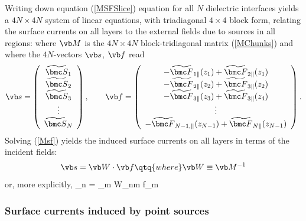 \documentclass[letterpaper]{article}
\renewcommand{\wt}{\widetilde}
\begin{document}
Writing down equation (\ref{MSFSlice}) equation for all $N$ dielectric
interfaces yields a $4N\times 4N$ 
system of linear equations, with triadiagonal $4\times 4$ block form,
relating the surface currents on all layers
to the external fields due to sources in all regions:
where $\vb M$ is the $4N\times 4N$ block-tridiagonal matrix
(\ref{MChunks}) and where the $4N$-vectors $\vb s$, $\vb f$ read
$$ 
   \vb s=\left(\begin{array}{c}
   \wt{\bmc S}_1 \\ \wt{\bmc S}_2 \\ \wt{\bmc S}_3 \\ \vdots \\
   \wt{\bmc S}_N
   \end{array}\right),
\qquad 
   \vb f=\left(\begin{array}{c}
  -\wt{\bmc F}_{1\parallel}(z_1)
  +\wt{\bmc F}_{2\parallel}(z_1)
\\
  -\wt{\bmc F}_{2\parallel}(z_2)
  +\wt{\bmc F}_{3\parallel}(z_2)
\\
  -\wt{\bmc F}_{3\parallel}(z_3)
  +\wt{\bmc F}_{3\parallel}(z_4)
\\
  \vdots
\\
  -\wt{\bmc F}_{N-1,\parallel}(z_{N-1})
  +\wt{\bmc F}_{N\parallel}(z_{N-1})
   \end{array}\right).
$$
Solving (\ref{Msf}) yields the induced surface currents on all
layers in terms of the incident fields:
$$ \vb s = \vb W \cdot \vb f \qtq{where} \vb W\equiv \vb M^{-1} $$
or, more explicitly,
{
 \wt{\bmc S}_n = \sum_{m} W_{nm} \vb f_m
}

\subsubsection*{Surface currents induced by point sources}
\end{document}
